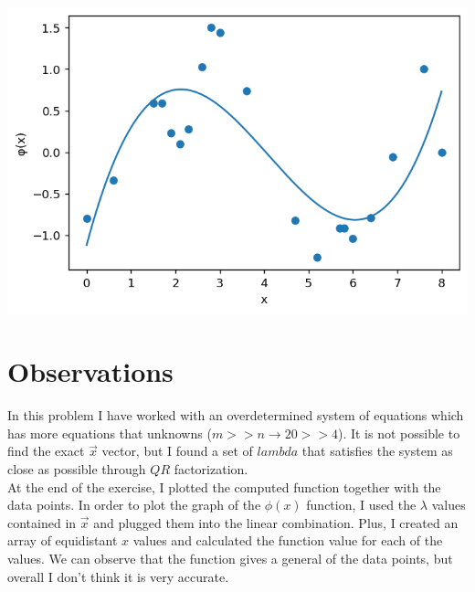 \documentclass{article}
\begin{document}
\includegraphics[width=\textwidth,height=\textheight,keepaspectratio]{graph.png}

\section{Observations}
In this problem I have worked with an overdetermined system of equations which has more equations that unknowns ($m >> n \rightarrow20 >> 4$). It is not possible to find the exact $\vec{x}$ vector, but I found a set of $lambda$ that satisfies the system as close as possible through $QR$ factorization. \\

At the end of the exercise, I plotted the computed function together with the data points. In order to plot the graph of the $\phi(x)$ function, I used the $\lambda$ values contained in $\vec{x}$ and plugged them into the linear combination. Plus, I created an array of equidistant $x$ values and calculated the function value for each of the values. We can observe that the function gives a general of the data points, but overall I don't think it is very accurate.
\end{document}
